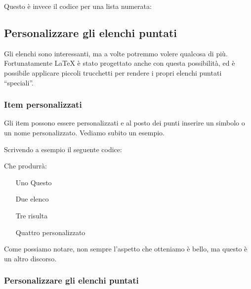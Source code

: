 \vspace{\abovedisplayskip}
\begin{minipage}{\linewidth}
  \noindent Questo è invece il codice per una lista numerata:
  
\end{minipage}
\vspace{\belowdisplayskip}


\subsection{Personalizzare gli elenchi puntati}

Gli elenchi sono interessanti, ma a volte potremmo volere qualcosa di più. 
Fortunatamente \LaTeX{} è stato progettato anche con questa possibilità, ed è 
possibile applicare piccoli trucchetti per rendere i propri elenchi puntati 
``speciali''.

\subsubsection{Item personalizzati}

Gli item possono essere personalizzati e al posto dei punti inserire un simbolo 
o un nome personalizzato. Vediamo subito un esempio.

Scrivendo a esempio il seguente codice:



\vspace{\abovedisplayskip}
\begin{minipage}{\linewidth}
  Che produrrà:

  \begin{itemize}
    \item[Uno] Questo
    \item[Due] elenco
    \item[Tre] risulta
    \item[Quattro] personalizzato
  \end{itemize} 
 
\end{minipage}
\vspace{\belowdisplayskip}


\noindent Come possiamo notare, non sempre l'aspetto che otteniamo è bello, ma 
questo è un altro discorso.

\subsubsection{Personalizzare gli elenchi puntati}


